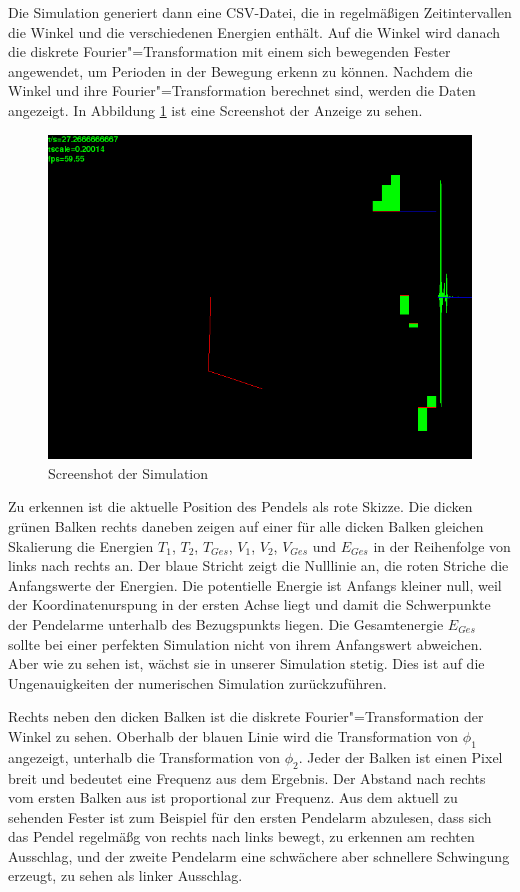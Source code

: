 Die Simulation generiert dann eine CSV-Datei, die in regelmäßigen Zeitintervallen die Winkel und die verschiedenen Energien enthält.
Auf die Winkel wird danach die diskrete Fourier"=Transformation mit einem sich bewegenden Fester angewendet, um Perioden in der Bewegung erkenn zu können.
Nachdem die Winkel und ihre Fourier"=Transformation berechnet sind, werden die Daten angezeigt.
In Abbildung \ref{fig:hssim} ist eine Screenshot der Anzeige zu sehen.

\begin{figure}[bht]
  \includegraphics[width=\textwidth]{images/haskell_simulation_fwindow1000_cropped.png}
  \caption{Screenshot der Simulation}
  \label{fig:hssim}
\end{figure}

Zu erkennen ist die aktuelle Position des Pendels als rote Skizze.
Die dicken grünen Balken rechts daneben zeigen auf einer für alle dicken Balken gleichen Skalierung die Energien $T_1$, $T_2$, $T_{Ges}$, $V_1$, $V_2$, $V_{Ges}$ und $E_{Ges}$ in der Reihenfolge von links nach rechts an.
Der blaue Stricht zeigt die Nulllinie an, die roten Striche die Anfangswerte der Energien.
Die potentielle Energie ist Anfangs kleiner null, weil der Koordinatenurspung in der ersten Achse liegt und damit die Schwerpunkte der Pendelarme unterhalb des Bezugspunkts liegen.
Die Gesamtenergie $E_{Ges}$ sollte bei einer perfekten Simulation nicht von ihrem Anfangswert abweichen. Aber wie zu sehen ist, wächst sie in unserer Simulation stetig.
Dies ist auf die Ungenauigkeiten der numerischen Simulation zurückzuführen.

Rechts neben den dicken Balken ist die diskrete Fourier"=Transformation der Winkel zu sehen.
Oberhalb der blauen Linie wird die Transformation von $\phi_1$ angezeigt, unterhalb die Transformation von $\phi_2$.
Jeder der Balken ist einen Pixel breit und bedeutet eine Frequenz aus dem Ergebnis.
Der Abstand nach rechts vom ersten Balken aus ist proportional zur Frequenz.
Aus dem aktuell zu sehenden Fester ist zum Beispiel für den ersten Pendelarm abzulesen, dass sich das Pendel regelmäßg von rechts nach links bewegt, zu erkennen am rechten Ausschlag, und der zweite Pendelarm eine schwächere aber schnellere Schwingung erzeugt, zu sehen als linker Ausschlag.

